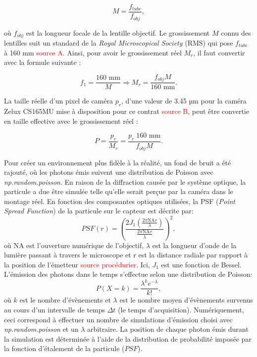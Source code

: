 \documentclass[conference]{IEEEtran}
\begin{document}
\begin{equation}
  M = \frac{f_{tube}}{f_{obj}},
\end{equation}

où $f_{obj}$ est la longueur focale de la lentille objectif. Le grossissement $M$ connu des lentilles suit
un standard de la \textit{Royal Microscopical Society} (RMS) qui pose $f_{tube}$ à 160 mm
\textcolor{red}{source A}. Ainsi, pour avoir le grossissement réel $M_{r}$, il faut convertir avec la 
formule suivante :


\begin{equation}
  f_{1}= \frac{160 \text{ mm} }{M} \Rightarrow M_{r} = \frac{f_{obj}M}{160 \text{ mm} }.
\end{equation}

La taille réelle d'un pixel de caméra $p_r$, d'une valeur de 3.45 µm pour la caméra Zelux CS165MU
mise à disposition pour ce contrat \textcolor{red}{source B}, peut être convertie en taille effective
avec le grossissement réel :

\begin{equation}\label{pixel}
  P = \frac{p_{r}}{M_{r}} = \frac{p_{r}\;160 \text{ mm}}{f_{obj}M}.
\end{equation}



Pour créer un environnement plus fidèle à la réalité, un fond de bruit
a été rajouté, où les photons émis suivent une distribution de Poisson avec \textit{np.random.poisson}. En raison de la diffraction 
causée par le système optique, la particule a due être simulée
telle qu'elle serait perçue par la caméra dans le montage réel. En fonction des composantes optiques utilisées,
la PSF (\textit{Point Spread Function}) de la particule sur le capteur est décrite par:
\begin{equation}
  PSF(r)=\left(\frac{2J_1(\frac{2\pi \text{NA}r}{\lambda})}{\frac{2\pi \text{NA}r}{\lambda}}\right)^2,
\end{equation}
où NA est l'ouverture numérique de l'objectif, $\lambda$ est la longueur d'onde de la lumière passant à travers
le microscope et r est la distance radiale par rapport à la position de l'émetteur \textcolor{red}{source procédurier}. Ici, $J_1$
est une fonction de Bessel. L'émission des photons dans le temps s'effectue selon une distribution de Poisson:
\begin{equation}
  P(X=k)=\frac{\lambda^k e^{-\lambda}}{k!},
\end{equation}
où $k$ est le nombre d'évènements et $\lambda$ est le nombre moyen d'évènements
survenus au cours d'un intervalle de temps $\Delta t$ (le temps d'acquisition). Numériquement, ceci correspond à effectuer un nombre de simulations
d'émission choisi avec \textit{np.random.poisson} et un $\lambda$ arbitraire. La position de chaque photon
émis durant la simulation est déterminée à l'aide de la distribution de probabilité imposée par la fonction d'étalement 
de la particule ($PSF$).
\end{document}

